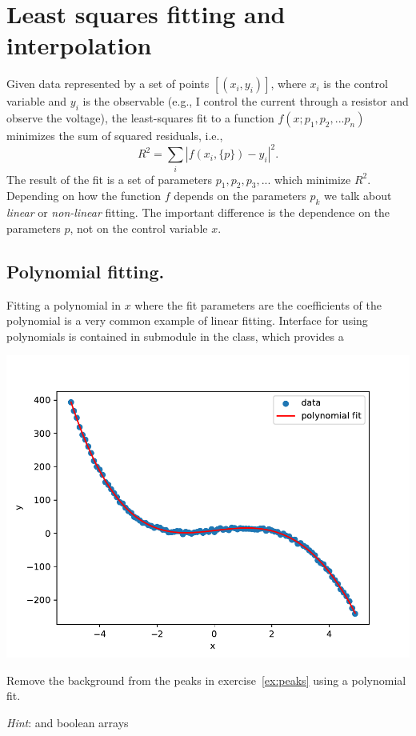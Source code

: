 \newpage
\section{Least squares fitting and interpolation}
Given data represented by a set of points $[(x_i, y_i)]$, where $x_i$ is the control variable and $y_i$ is the observable (e.g., I control the current through a resistor and observe the voltage), the least-squares fit to a function $f(x; p_1, p_2, ... p_n)$ minimizes the sum of squared residuals, i.e.,
\begin{equation}
    R^2 = \sum_i \left|f(x_i, \{p\}) - y_i\right|^2.
\end{equation}
The result of the fit is a set of parameters $p_1, p_2, p_3, ...$ which minimize $R^2$. Depending on how the function $f$ depends on the parameters $p_k$ we talk about \emph{linear} or \emph{non-linear} fitting. The important difference is the dependence on the parameters $p$, not on the control variable $x$. 


\subsection{Polynomial fitting.}
Fitting a polynomial in $x$ where the fit parameters are the coefficients of the polynomial is a very common example of linear fitting. Interface for using polynomials is contained in  submodule in the  class, which provides a 


\begin{center}
    \includegraphics[width=0.5\linewidth]{polynomial_fit.pdf}
\end{center}

\begin{exercise}
    Remove the background from the peaks in exercise~\ref{ex:peaks} using a polynomial fit.

    \emph{Hint}:  and boolean arrays
\end{exercise}

